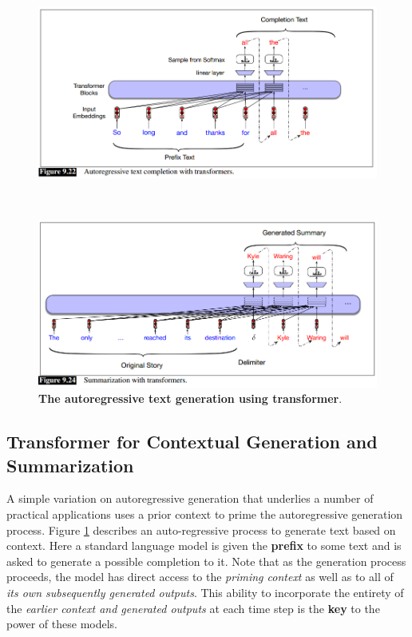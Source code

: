 \documentclass[11pt]{article}
\begin{document}
\begin{figure}
\begin{minipage}[t]{1\linewidth}
  \centering
  \centerline{\includegraphics[scale = 0.4]{autoregressive_text.png}}
\end{minipage}\\
\begin{minipage}[t]{1\linewidth}
  \centering
  \centerline{\includegraphics[scale = 0.4]{text_summarization.png}}
\end{minipage}
\caption{\footnotesize{\textbf{The autoregressive text generation using transformer}.}}
\label{fig: auto_text}
\end{figure}

\subsection{Transformer for Contextual Generation and Summarization}
A simple variation on autoregressive generation that underlies a number of practical applications uses a prior context to prime the autoregressive generation process. Figure \ref{fig: auto_text} describes an auto-regressive process to generate text based on context. Here a standard language
model is given the \textbf{prefix} to some text and is asked to generate a possible completion to it. Note that as the generation process proceeds, the model has direct access to the \emph{priming context} as well as to all of \emph{its own subsequently generated outputs}. This ability to incorporate the entirety of the \emph{earlier context and generated outputs} at each time step is the \textbf{key} to the power of these models.
\end{document}
